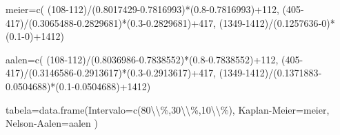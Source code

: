 \documentclass[
]{article}
\newenvironment{Shaded}{\begin{snugshade}}{\end{snugshade}}
\newcommand{\AttributeTok}[1]{\textcolor[rgb]{0.77,0.63,0.00}{#1}}
\newcommand{\DecValTok}[1]{\textcolor[rgb]{0.00,0.00,0.81}{#1}}
\newcommand{\FloatTok}[1]{\textcolor[rgb]{0.00,0.00,0.81}{#1}}
\newcommand{\FunctionTok}[1]{\textcolor[rgb]{0.00,0.00,0.00}{#1}}
\newcommand{\NormalTok}[1]{#1}
\newcommand{\OtherTok}[1]{\textcolor[rgb]{0.56,0.35,0.01}{#1}}
\newcommand{\SpecialCharTok}[1]{\textcolor[rgb]{0.00,0.00,0.00}{#1}}
\newcommand{\StringTok}[1]{\textcolor[rgb]{0.31,0.60,0.02}{#1}}
\begin{document}
\hspace{2 pt}

\begin{Shaded}
\begin{Highlighting}[]
\NormalTok{meier}\OtherTok{=}\FunctionTok{c}\NormalTok{(}
\NormalTok{  (}\DecValTok{108{-}112}\NormalTok{)}\SpecialCharTok{/}\NormalTok{(}\FloatTok{0.8017429{-}0.7816993}\NormalTok{)}\SpecialCharTok{*}\NormalTok{(}\FloatTok{0.8{-}0.7816993}\NormalTok{)}\SpecialCharTok{+}\DecValTok{112}\NormalTok{,}
\NormalTok{  (}\DecValTok{405{-}417}\NormalTok{)}\SpecialCharTok{/}\NormalTok{(}\FloatTok{0.3065488{-}0.2829681}\NormalTok{)}\SpecialCharTok{*}\NormalTok{(}\FloatTok{0.3{-}0.2829681}\NormalTok{)}\SpecialCharTok{+}\DecValTok{417}\NormalTok{,}
\NormalTok{  (}\DecValTok{1349{-}1412}\NormalTok{)}\SpecialCharTok{/}\NormalTok{(}\FloatTok{0.1257636}\DecValTok{{-}0}\NormalTok{)}\SpecialCharTok{*}\NormalTok{(}\FloatTok{0.1}\DecValTok{{-}0}\NormalTok{)}\SpecialCharTok{+}\DecValTok{1412}\NormalTok{)}

\NormalTok{aalen}\OtherTok{=}\FunctionTok{c}\NormalTok{(}
\NormalTok{  (}\DecValTok{108{-}112}\NormalTok{)}\SpecialCharTok{/}\NormalTok{(}\FloatTok{0.8036986{-}0.7838552}\NormalTok{)}\SpecialCharTok{*}\NormalTok{(}\FloatTok{0.8{-}0.7838552}\NormalTok{)}\SpecialCharTok{+}\DecValTok{112}\NormalTok{,}
\NormalTok{  (}\DecValTok{405{-}417}\NormalTok{)}\SpecialCharTok{/}\NormalTok{(}\FloatTok{0.3146586{-}0.2913617}\NormalTok{)}\SpecialCharTok{*}\NormalTok{(}\FloatTok{0.3{-}0.2913617}\NormalTok{)}\SpecialCharTok{+}\DecValTok{417}\NormalTok{,}
\NormalTok{  (}\DecValTok{1349{-}1412}\NormalTok{)}\SpecialCharTok{/}\NormalTok{(}\FloatTok{0.1371883{-}0.0504688}\NormalTok{)}\SpecialCharTok{*}\NormalTok{(}\FloatTok{0.1{-}0.0504688}\NormalTok{)}\SpecialCharTok{+}\DecValTok{1412}\NormalTok{)}


\NormalTok{tabela}\OtherTok{=}\FunctionTok{data.frame}\NormalTok{(}\AttributeTok{Intervalo=}\FunctionTok{c}\NormalTok{(}\StringTok{\textquotesingle{}80}\SpecialCharTok{\textbackslash{}\textbackslash{}}\StringTok{\%\textquotesingle{}}\NormalTok{,}\StringTok{\textquotesingle{}30}\SpecialCharTok{\textbackslash{}\textbackslash{}}\StringTok{\%\textquotesingle{}}\NormalTok{,}\StringTok{\textquotesingle{}10}\SpecialCharTok{\textbackslash{}\textbackslash{}}\StringTok{\%\textquotesingle{}}\NormalTok{),}
                  \StringTok{\textquotesingle{}Kaplan{-}Meier\textquotesingle{}}\OtherTok{=}\NormalTok{meier,}
                  \StringTok{\textquotesingle{}Nelson{-}Aalen\textquotesingle{}}\OtherTok{=}\NormalTok{aalen}
\NormalTok{                  )}


\end{Highlighting}
\end{Shaded}
\end{document}
